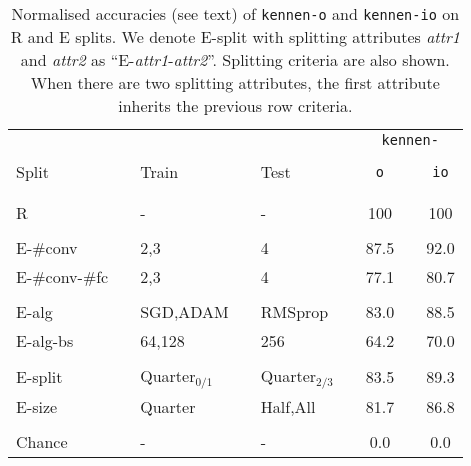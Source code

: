 \documentclass{article} %
\newcommand{\OR}{\texttt{kennen-o}\xspace}
\newcommand{\ORIC}{\texttt{kennen-io}\xspace}
\begin{document}
\begin{wraptable}{r}{0.5\columnwidth}
\vspace{-2.0em}
\footnotesize
\caption{\label{tab:mnist-extrap}Normalised accuracies (see text) of \OR and \ORIC on R and E splits. We denote E-split with splitting attributes \emph{attr1} and \emph{attr2} as ``E-\emph{attr1}-\emph{attr2}''. Splitting criteria are also shown. When there are two splitting attributes, the first attribute inherits the previous row criteria.}
\vspace{-1em}
\begin{centering}
\setlength{\tabcolsep}{0.3em}
\begin{tabular}{lclclcccc}
     &&     &&    &&\multicolumn{3}{c}{\texttt{kennen-}}  \tabularnewline
\cline{7-9}
\vspace{-0.8em} &   \tabularnewline
Split&&Train&&Test&&\texttt{o}&&\texttt{io}\tabularnewline
\cline{1-1} \cline{3-3} \cline{5-5} \cline{7-7} \cline{9-9}
\vspace{-1em} &   \tabularnewline
\cline{1-1} \cline{3-3} \cline{5-5} \cline{7-7} \cline{9-9}
\vspace{-0.8em} &   \tabularnewline
R&&-&&-&&100&&100\tabularnewline
\cline{1-1} \cline{3-3} \cline{5-5} \cline{7-7} \cline{9-9}
\vspace{-0.8em} &   \tabularnewline
E-\#\ignorespaces conv&&2,3&&4&&87.5&&92.0\tabularnewline
E-\#\ignorespaces conv-\#\ignorespaces fc&&2,3&&4&&77.1&&80.7\tabularnewline
\cline{1-1} \cline{3-3} \cline{5-5} \cline{7-7} \cline{9-9}
\vspace{-0.8em} &   \tabularnewline
E-alg&&{\scriptsize SGD,ADAM}&&{\scriptsize RMSprop}&&83.0&&88.5\tabularnewline
E-alg-bs&&64,128&&256&&64.2&&70.0\tabularnewline
\cline{1-1} \cline{3-3} \cline{5-5} \cline{7-7} \cline{9-9}
\vspace{-0.8em} &   \tabularnewline
E-split&&{\scriptsize Quarter$_{0/1}$}&&{\scriptsize Quarter$_{2/3}$}&&83.5&&89.3\tabularnewline
E-size&&{\scriptsize Quarter}&&{\scriptsize Half,All}&&81.7&&86.8\tabularnewline
\cline{1-1} \cline{3-3} \cline{5-5} \cline{7-7} \cline{9-9}
\vspace{-0.8em} &   \tabularnewline
Chance&&-&&-&&0.0&&0.0\tabularnewline
\cline{1-1} \cline{3-3} \cline{5-5} \cline{7-7} \cline{9-9}
\end{tabular}
\par\end{centering}
\vspace{-2em}
\end{wraptable}
\end{document}
